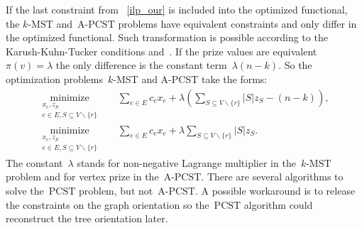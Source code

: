\documentclass[12pt]{article}
\begin{document}
If the last constraint from%
~\eqref{ilp_our}
is included into the optimized functional, the $k\text{-MST}$ and~$\text{A}$-$\text{PCST}$ problems have equivalent constraints and only differ in the optimized functional. Such transformation is possible according to the Karush-Kuhn-Tucker conditions and~\cite{ras2017approximate}. If the prize values are equivalent~$\pi(v) = \lambda$ the only difference is the constant term~$\lambda(n-k)$. So the optimization problems~$k$-MST and A-PCST take the forms:
\begin{align*}
\underset{\substack{x_e,z_S \\ e\in E, S\subseteq V\backslash \{r\}}}{\text{minimize}}\quad & \sum\limits_{e\in E}c_ex_e + \lambda\left(\sum\limits_{S\subseteq V\backslash \{r\}}|S|z_S - (n-k)\right),\\ %
\underset{\substack{x_e,z_S \\ e\in E, S\subseteq V\backslash \{r\}}}{\text{minimize}}\quad & \sum\limits_{e\in E}c_ex_e + \lambda\sum\limits_{S\subseteq V\backslash\{r\}}|S|z_S. %
\end{align*}
The constant~$\lambda$ stands for non-negative Lagrange multiplier in the~$k\text{-MST}$ problem and for vertex prize in the~$\text{A}$-$\text{PCST}$. There are several algorithms to solve the~$\text{PCST}$ problem, but not~$\text{A}$-$\text{PCST}$. A possible workaround is to release the constraints on the graph orientation so the~$\text{PCST}$ algorithm could reconstruct the tree orientation later.
\end{document}
